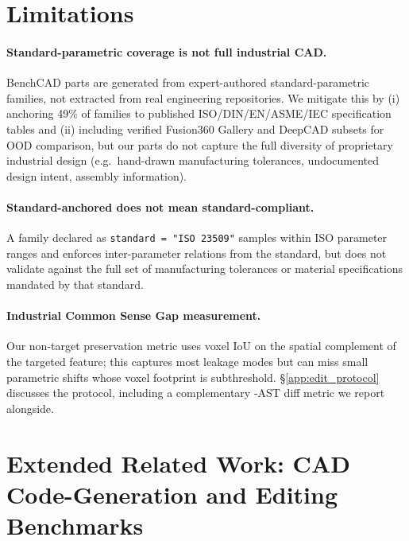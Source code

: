 \appendix

\section{Limitations}
\label{app:limitations}

\paragraph{Standard-parametric coverage is not full industrial CAD.} BenchCAD parts are generated from expert-authored standard-parametric families, not extracted from real engineering repositories.
We mitigate this by (i) anchoring 49\% of families to published ISO/DIN/EN/ASME/IEC specification tables and (ii) including verified Fusion360 Gallery and DeepCAD subsets for OOD comparison, but our parts do not capture the full diversity of proprietary industrial design (e.g.\ hand-drawn manufacturing tolerances, undocumented design intent, assembly information).

\paragraph{Standard-anchored does not mean standard-compliant.} A family declared as \texttt{standard = "ISO 23509"} samples within ISO parameter ranges and enforces inter-parameter relations from the standard, but does not validate against the full set of manufacturing tolerances or material specifications mandated by that standard.

\paragraph{Industrial Common Sense Gap measurement.} Our non-target preservation metric uses voxel IoU on the spatial complement of the targeted feature; this captures most leakage modes but can miss small parametric shifts whose voxel footprint is subthreshold.
\S\ref{app:edit_protocol} discusses the protocol, including a complementary -AST diff metric we report alongside.

\section{Extended Related Work: CAD Code-Generation and Editing Benchmarks}
\label{app:related_extended}

